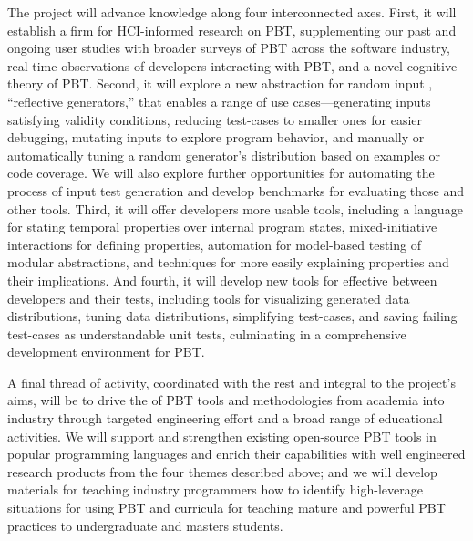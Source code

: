 The project will advance knowledge along four
interconnected axes.
%
First, it will establish a firm  for HCI-informed
research on PBT, supplementing our past and ongoing user studies with
broader surveys of PBT across the software industry, real-time
observations of developers interacting with PBT, and a novel cognitive
theory of PBT.
%
Second, it will explore a new abstraction for random input , ``reflective generators,'' that enables a range of use cases---generating inputs
satisfying validity conditions, reducing test-cases to smaller ones for easier
debugging,
mutating inputs to explore program behavior,
and manually or automatically tuning a random
generator's distribution based on examples or code coverage. We will also
explore further opportunities for automating the process of input test 
generation and develop benchmarks for evaluating those and other tools.
%
Third, it will offer developers more usable  tools,
including a language for stating temporal properties over internal
program states, mixed-initiative interactions for defining properties,
automation for model-based testing of
modular abstractions, and techniques for more easily explaining properties and
their implications.
%
And fourth, it will develop new tools for effective  between developers and their tests, including tools for
visualizing generated data
distributions, tuning data distributions, simplifying test-cases, and saving
  failing test-cases as understandable unit tests, culminating in a
  comprehensive development environment for PBT.

A final thread of activity, coordinated with the rest and integral to the
project's aims, will
%
be to drive the  of PBT tools and
methodologies from academia into industry through targeted engineering effort
and a broad range of educational activities.
We will support and strengthen existing
open-source PBT tools in popular programming languages and enrich their
capabilities with well engineered research products from the four
themes described above;
%
and we will
develop materials for teaching industry programmers how to identify
high-leverage situations for using PBT and curricula for teaching mature
and powerful PBT practices to undergraduate and masters students.
%

